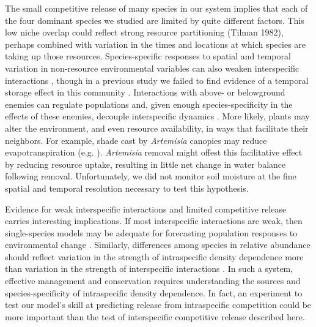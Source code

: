 \documentclass[11pt]{article}
\begin{document}
\begin{doublespacing}
The small competitive release of many species in our system implies that each of the four dominant species we studied are limited by quite different factors. This low niche overlap could reflect strong resource partitioning (Tilman 1982), perhaps combined with variation in the times and locations at which species are taking up those resources. Species-specific responses to spatial and temporal variation in non-resource environmental variables can also weaken interspecific interactions \citep{chesson_mechanisms_2000}, though in a previous study we failed to find evidence of a temporal storage effect in this community \citep{adler_weak_2009}. Interactions with above- or belowground enemies can regulate populations and, given enough species-specificity in the effects of these enemies, decouple interspecific dynamics \citep{hersh_evaluating_2011,janzen_herbivores_1970,connell_role_1971}.  More likely, plants may alter the environment, and even resource availability, in ways that facilitate their neighbors. For example, shade cast by \textit{Artemisia} canopies may reduce evapotranspiration (e.g. \citealt{Barbier2008}). \textit{Artemisia} removal might offest this facilitative effect by reducing resource uptake, resulting in little net change in water balance following removal.  Unfortunately, we did not monitor soil moisture at the fine spatial and temporal resolution necessary to test this hypothesis.

Evidence for weak interspecific interactions and limited competitive release carries interesting implications. If most interspecific interactions are weak, then single-species models may be adequate for forecasting population responses to environmental change \citep{adler_forecasting_2012,kleinhesselink_indirect_2015}. Similarly, differences among species in relative abundance should reflect variation in the strength of intraspecific density dependence more than variation in the strength of interspecific interactions \citep{yenni_strong_2012}. In such a system, effective management and conservation requires understanding the sources and species-specificity of intraspecific density dependence. In fact, an experiment to test our model's skill at predicting release from intraspecific competition could be more important than the test of interspecific competitive release described here.


\end{doublespacing}
\end{document}
